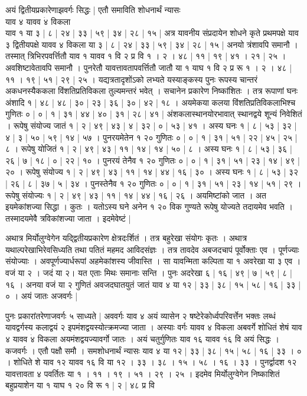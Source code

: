 \documentclass[11pt,a5paper]{book}
\begin{document}
{अयं द्वितीयप्रकारेणाझवर्गः सिद्धः | एतौ समाविति शोधनार्थं न्यासः \\ 
याव ४ यावव $\dot{४}$ विकला \\
याव १ या ३ | ८ | २४ | ३३ | ५९ | ३४ | २८ | १५ | अत्र यावनीय 
संप्रदायेन शोधने कृते प्रथमपक्षे याव ३ द्वितीयपक्षे यावव ४ विकला या ३ | ८ | २४ |
३३ | ५९ | ३४ | २८ | १५ | अनयो त्रंशावपि समानौ ।
तस्मात् त्रिभिरपवर्त्तितौ याव १ यावव १ वि २ प्र वि १ । २ । ४८ | ११ |
१९ | ४१ । २१ | २५ । अवशिष्टावेतावपि समानौ । 
पुनरेतौ यावत्तावतापवर्त्तितौ जातौ या १ याघ १ वि २ प्र रू १ । २ । ४८ | ११ । १९ | ५१ | २९ | २५ । 
यद्यत्रतादृशोंऽको लभ्यते यस्याङ्कस्य पुनः रूपस्य चान्तरं अकधनस्यैककला विंशतिप्रतिविकला तुल्यमन्तरं भवेत् ।
सचानेन प्रकारेण निष्कांशितः । तत्र रूपाणां घनः अंशादि १ | ४८ | ४८ | ३० | २३ | ३६ | ३० | ४२ | १८ । अयमेकया कलया विंशतिप्रतिविकलाभिश्च गुणितः ० | ० | १ | ३१ | ४४ | ४० | ३१ | २८ | ४१ | अंशकलास्थानयोरभावात् स्थानद्वये शून्यं निवेशितं । 
रूपेषु संयोज्य जातं १ | २ | ४९ | ४३ | ४ | ३२ | ० | ५३ | ४१ । अस्य घनः १ | ८ | ५३ | ३२ | ४ | ३ | ५० | ५९ | १४ | ५७ । पुनरयमेतेन १ २० गुणितः ० | ० | १ | ३१ | ५१ | २२ | ४५ | २५ | ८ । रूपेषु योजितं १ | २ | ४९ | ४३ | ११ | १४ | १४ | ५० | ८ । अस्य घनः १ | ८ | ५३ | ३६ | २६ | ७ | १८ | ० | २२ | १० । पुनरयं तेनैव १ २० गुणितः ० | ० | १ | ३१ | ५१ | २३ | १४ | ४९ | २० । रूपेषु संयोज्य १ | २ | ४९ | ४३ | ११ | १४ | ४४ | १६ | ३० । अस्य घनः १ | ८ | ५३ | ३२ | २६ | ८ | ३७ | ५ | ३४ । पुनस्तेनैव १ २० गुणितः ० | ० | १ | ३१ | ५१ | २३ | १४ | ५१ | २९ ।
रूपेषु संयोज्यः १ | २ | ४९ | ४३ | ११ | १४ | ४४ | १६ | २६ । अयमिष्टांको जात । अत इयमेकांशज्या सिद्धा । कुतः । यतोऽस्य घने अनेन १ २० विक 
गुण्यते रूपेषु योज्यते तदायमेव भवति । तस्मादयमेवै त्रविकांशज्या जाता । इदमेवेष्टं |





अथात्र मिर्योलुग्वेगेन
यद्द्वितीयप्रकारेण क्षेत्रदःर्शितं । तत्र बहुरेखा संयोगः कृतः । अथात्र यथाल्परेखाभिरेवसिध्यति तथा पतितं महमद आविदसंज्ञः । 
तत्र तावदेव अबजदचापं पूर्वोक्ताः एव । पूर्णज्याः
संयोज्याः । अवपूर्णज्यार्धरूपां अहमेकांशस्य जीवास्ति । 
सा यावन्मिता कल्पिता या १ अवरेखा या ३ एव । वजं  या २ । जदं या २। यत एताः मिथः
समानाः सन्ति । पुनः अदरेखा ६ | १६ | ४९ | ७ | ५९ | ८ | १६ । अनया वजं या २
गुणितं अवजदघातयुतं जातं याव ४ या १२ | ३३ | ३८ | १५ | ५८ | १६ | ३३ | ० । अयं
जातः अजवर्गः |





पुनः प्रकारांतरेणाजवर्गः ५ साध्यते | अववर्गः याव ४
अयं व्यासेन २ षष्टेरेकोर्ध्वपरिवर्त्तेन भक्तः लब्धं
यावद्वर्गस्य कलाद्वयं २ इपमंशद्वयस्योत्क्रमज्या जाता । अस्याः वर्गः यावव ४
विकला अबवर्गे शोधितं शेषं याव ४ यावव $\dot{४}$ विकला अयमंशद्वयज्यावर्गो
जातः । अयं चतुर्गुणितः याव १६ यावव $\dot{१६}$ वि अयं
सिद्धः । कजवर्गः । एतौ पक्षौ समौ । समशोधनार्थं न्यासः याव ४ या १२ |
३३ | ३८ | १५ | ५८ | १६ | ३३ । ० । शोधिते शे याव १२  यावव १६  वि या १२ । ३३ । ३८ । १५ । ५८ । १६ । ३३ ।  
पुनर्द्वादश १२ यावत्तावता ४ पवर्तितः या १ । ११ । १९ । ५१ । २९ । २५ ।
इदमेव मिर्योलुग्वेगेन निष्काशितं बहुप्रयाशेन
या १ याघ १ २० वि रू १ | २ | ४८ प्र वि 




}
\end{document}
